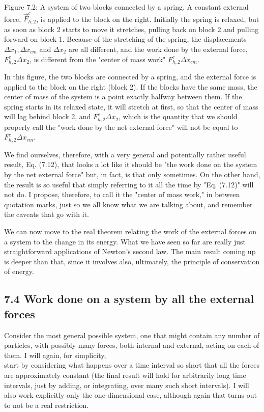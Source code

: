 \documentclass[10pt]{article}
\begin{document}
Figure 7.2: A system of two blocks connected by a spring. A constant external force, $\vec{F}_{h, 2}^{c}$, is applied to the block on the right. Initially the spring is relaxed, but as soon as block 2 starts to move it stretches, pulling back on block 2 and pulling forward on block 1. Because of the stretching of the spring, the displacements $\Delta x_{1}, \Delta x_{c m}$ and $\Delta x_{2}$ are all different, and the work done by the external force, $F_{h, 2}^{c} \Delta x_{2}$, is different from the "center of mass work" $F_{h, 2}^{c} \Delta x_{c m}$.

In this figure, the two blocks are connected by a spring, and the external force is applied to the block on the right (block 2). If the blocks have the same mass, the center of mass of the system is a point exactly halfway between them. If the spring starts in its relaxed state, it will stretch at first, so that the center of mass will lag behind block 2, and $F_{h, 2}^{c} \Delta x_{2}$, which is the quantity that we should properly call the "work done by the net external force" will not be equal to $F_{h, 2}^{c} \Delta x_{c m}$.

We find ourselves, therefore, with a very general and potentially rather useful result, Eq. (7.12), that looks a lot like it should be "the work done on the system by the net external force" but, in fact, is that only sometimes. On the other hand, the result is so useful that simply referring to it all the time by "Eq. (7.12)" will not do. I propose, therefore, to call it the "center of mass work," in between quotation marks, just so we all know what we are talking about, and remember the caveats that go with it.

We can now move to the real theorem relating the work of the external forces on a system to the change in its energy. What we have seen so far are really just straightforward applications of Newton's second law. The main result coming up is deeper than that, since it involves also, ultimately, the principle of conservation of energy.

\subsection*{7.4 Work done on a system by all the external forces}
Consider the most general possible system, one that might contain any number of particles, with possibly many forces, both internal and external, acting on each of them. I will again, for simplicity,\\
start by considering what happens over a time interval so short that all the forces are approximately constant (the final result will hold for arbitrarily long time intervals, just by adding, or integrating, over many such short intervals). I will also work explicitly only the one-dimensional case, although again that turns out to not be a real restriction.
\end{document}
